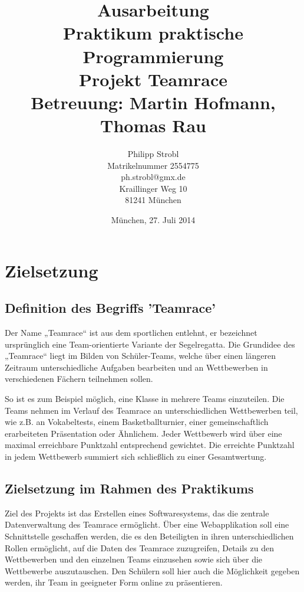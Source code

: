 \documentclass[12pt]{report}
\title{Ausarbeitung\bigskip\\
Praktikum praktische Programmierung\bigskip\\
\textbf{Projekt Teamrace}\bigskip\\
\large Betreuung: Martin Hofmann, Thomas Rau}
\author{Philipp Strobl\\Matrikelnummer 2554775\\
ph.strobl@gmx.de\\
Kraillinger Weg 10\\
81241 München}
\date{München, 27. Juli 2014}
\begin{document}
\maketitle
\pagebreak

\tableofcontents 


\chapter{Zielsetzung}

\section{Definition des Begriffs 'Teamrace'}

Der Name „Teamrace“ ist aus dem sportlichen entlehnt, er bezeichnet ursprünglich eine Team-orientierte Variante der Segelregatta. 
\cite{wiki:TeamRacing} Die Grundidee des „Teamrace“ liegt im Bilden von Schüler-Teams, welche über einen längeren Zeitraum unterschiedliche Aufgaben bearbeiten und an Wettbewerben in verschiedenen Fächern teilnehmen sollen.

So ist es zum Beispiel möglich, eine Klasse in mehrere Teams einzuteilen. Die Teams nehmen im Verlauf des Teamrace an unterschiedlichen Wettbewerben teil, wie z.B. an Vokabeltests, einem Basketballturnier, einer gemeinschaftlich erarbeiteten Präsentation oder Ähnlichem. Jeder Wettbewerb wird über eine maximal erreichbare Punktzahl entsprechend gewichtet. Die erreichte Punktzahl in jedem Wettbewerb summiert sich schließlich zu einer Gesamtwertung.

\section{Zielsetzung im Rahmen des Praktikums}
\label{sec:Zielsetzung}
Ziel des Projekts ist das Erstellen eines Softwaresystems, das die zentrale Datenverwaltung des Teamrace ermöglicht. Über eine Webapplikation soll eine Schnittstelle geschaffen werden, die es den Beteiligten in ihren unterschiedlichen Rollen ermöglicht, auf die Daten des Teamrace zuzugreifen, Details zu den Wettbewerben und den einzelnen Teams einzusehen sowie sich über die Wettbewerbe auszutauschen. Den Schülern soll hier auch die Möglichkeit gegeben werden, ihr Team in geeigneter Form online zu präsentieren. 
\end{document}
